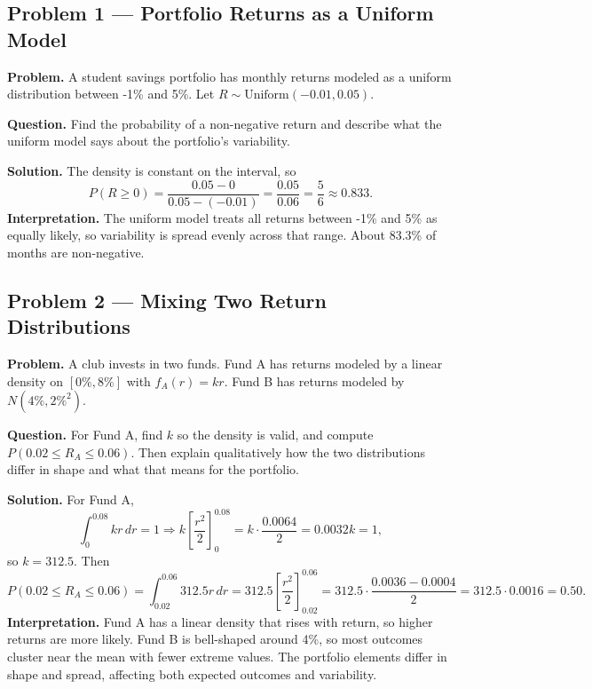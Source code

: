 	\begin{ExamProblems}
		
		\hypertarget{c8-ex1}{}
		\item
		\subsection*{Problem 1 — Portfolio Returns as a Uniform Model}
		
		\textbf{Problem.}
		A student savings portfolio has monthly returns modeled as a uniform distribution
		between -1\% and 5\%. Let \(R\sim\text{Uniform}(-0.01,0.05)\).
		
		\textbf{Question.} Find the probability of a non-negative return and describe what the uniform model
		says about the portfolio's variability.
		
		\textbf{Solution.}
		The density is constant on the interval, so
		\[
		P(R\ge 0)=\frac{0.05-0}{0.05-(-0.01)}=\frac{0.05}{0.06}=\frac{5}{6}\approx 0.833.
		\]
		\textbf{Interpretation.} The uniform model treats all returns between -1\% and 5\% as equally likely,
		so variability is spread evenly across that range. About 83.3\% of months are non-negative.
		
		
		\hypertarget{c8-ex2}{}
		\item
		\subsection*{Problem 2 — Mixing Two Return Distributions}
		
		\textbf{Problem.}
		A club invests in two funds. Fund A has returns modeled by a linear density on \([0\%,8\%]\)
		with \(f_A(r)=kr\). Fund B has returns modeled by \(N(4\%,2\%^2)\).
		
		\textbf{Question.} For Fund A, find \(k\) so the density is valid, and compute \(P(0.02\le R_A\le 0.06)\).
		Then explain qualitatively how the two distributions differ in shape and what that means for the portfolio.
		
		\textbf{Solution.}
		For Fund A,
		\[
		\int_0^{0.08} kr\,dr=1\Rightarrow k\left[\frac{r^2}{2}\right]_0^{0.08}=k\cdot\frac{0.0064}{2}=0.0032k=1,
		\]
		so \(k=312.5\). Then
		\[
		P(0.02\le R_A\le 0.06)=\int_{0.02}^{0.06} 312.5r\,dr
		=312.5\left[\frac{r^2}{2}\right]_{0.02}^{0.06}
		=312.5\cdot\frac{0.0036-0.0004}{2}=312.5\cdot 0.0016=0.50.
		\]
		\textbf{Interpretation.} Fund A has a linear density that rises with return, so higher returns are more likely.
		Fund B is bell-shaped around 4\%, so most outcomes cluster near the mean with fewer extreme values.
		The portfolio elements differ in shape and spread, affecting both expected outcomes and variability.
		

\end{ExamProblems}
